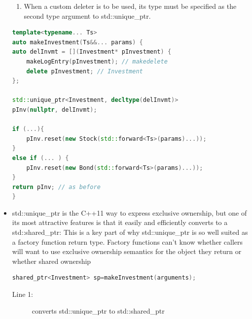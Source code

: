 \documentclass[a4paper,11pt,twoside]{book}
\begin{document}
\begin{itemize}
\begin{enumerate}
\item When a custom deleter is to be used, its type must be specified as the second type argument to std::unique\_ptr.
\end{enumerate}

\begin{lstlisting}[frame=single, language=c++, mathescape=true]
template<typename... Ts>
auto makeInvestment(Ts&&... params) {
auto delInvmt = [](Investment* pInvestment) {
	makeLogEntry(pInvestment); // makedelete
	delete pInvestment; // Investment
};

std::unique_ptr<Investment, decltype(delInvmt)>
pInv(nullptr, delInvmt);

if (...){
	pInv.reset(new Stock(std::forward<Ts>(params)...));
}
else if (... ) {
	pInv.reset(new Bond(std::forward<Ts>(params)...));
}
return pInv; // as before
}
\end{lstlisting}

\item std::unique\_ptr is the C++11 way to express exclusive ownership, but one of its
most attractive features is that it easily and efficiently converts to a std::shared\_ptr: This is a key part of why std::unique\_ptr is so well suited as a factory function return type. Factory functions can't know whether callers will want to use exclusive ownership semantics for the object they return or whether shared ownership
\begin{lstlisting}[frame=single, language=c++, mathescape=true]
shared_ptr<Investment> sp=makeInvestment(arguments); 
\end{lstlisting}
\begin{description}
	\item[Line 1:] converts std::unique\_ptr to std::shared\_ptr
\end{description}

\end{itemize}
\end{document}
